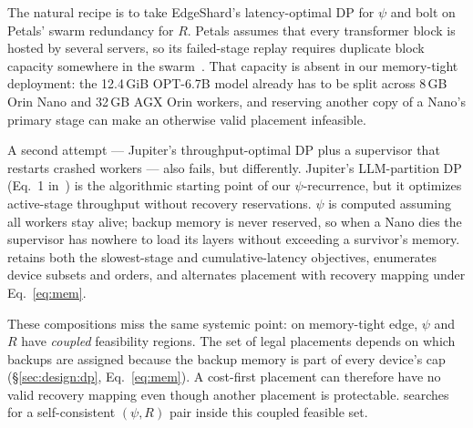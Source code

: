 The natural recipe is to take EdgeShard's latency-optimal DP for
$\psi$ and bolt on Petals' swarm redundancy for $R$. Petals assumes
that every transformer block is hosted by several servers, so its
failed-stage replay requires duplicate block capacity somewhere in the
swarm~\cite{borzunov2023distributed}. That capacity is absent in our
memory-tight deployment: the 12.4\,GiB OPT-6.7B model already has to be
split across 8\,GB Orin Nano and 32\,GB AGX Orin workers, and reserving
another copy of a Nano's primary stage can make an otherwise valid
placement infeasible.

A second attempt --- Jupiter's throughput-optimal DP plus a
supervisor that restarts crashed workers --- also fails, but
differently. Jupiter's LLM-partition DP (Eq.~1
in~\cite{ye2025jupiter}) is the algorithmic starting point of our
$\psi$-recurrence, but it optimizes active-stage throughput without
recovery reservations. $\psi$ is computed
assuming all workers stay alive; backup memory is never
reserved, so when a Nano dies the supervisor has nowhere to load
its layers without exceeding a survivor's memory. \sys{} retains
both the slowest-stage and cumulative-latency objectives, enumerates
device subsets and orders, and alternates placement with recovery
mapping under Eq.~\ref{eq:mem}.

These compositions miss the same systemic point: on
memory-tight edge, $\psi$ and $R$ have \emph{coupled} feasibility
regions. The set of legal placements depends on which backups are
assigned because the backup memory is part of every device's cap
(\S\ref{sec:design:dp}, Eq.~\ref{eq:mem}). A cost-first placement
can therefore have no valid recovery mapping even though another
placement is protectable. \sys{} searches for a self-consistent
$(\psi,R)$ pair inside this coupled feasible set.
